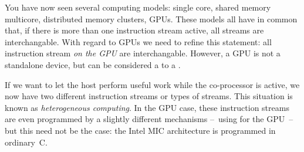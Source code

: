
You have now seen several computing models: single core, shared memory
multicore, distributed memory clusters, GPUs. These models all have in
common that, if there is more than one instruction stream active, all
streams are interchangable. With regard to GPUs we need to refine this
statement: all instruction stream \emph{on the GPU} are
interchangable. However, a GPU is not a standalone device, but can be
considered a  to a . 

If we want to let the host perform useful work while the co-processor
is active, we now have two different instruction streams or types of
streams. This situation is known as \emph{heterogeneous computing}.
In the GPU case, these instruction streams are even
programmed by a slightly different mechanisms --~using
 for the GPU~-- but this need not be the case: the
 Intel \acf{MIC} architecture is programmed in
ordinary~C.
